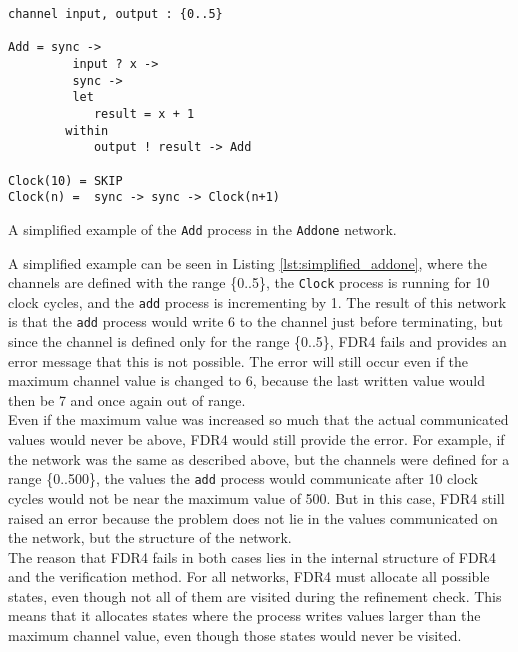 \begin{listing}
\begin{verbatim}
channel input, output : {0..5}

Add = sync ->
         input ? x ->
         sync ->
         let
            result = x + 1
        within
            output ! result -> Add

Clock(10) = SKIP
Clock(n) =  sync -> sync -> Clock(n+1)
\end{verbatim}
\caption{A simplified example of the \texttt{Add} process in the \texttt{Addone} network.}
\label{lst:simplified_addone}
\end{listing}
A simplified example can be seen in Listing \ref{lst:simplified_addone}, where the channels are defined with the range \{0..5\}, the \texttt{Clock} process is running for 10 clock cycles, and the \texttt{add} process is incrementing by 1.
The result of this network is that the \texttt{add} process would write 6 to the channel just before terminating, but since the channel is defined only for the range \{0..5\}, FDR4 fails and provides an error message that this is not possible. The error will still occur even if the maximum channel value is changed to 6, because the last written value would then be 7 and once again out of range. \\

Even if the maximum value was increased so much that the actual communicated values would never be above, FDR4 would still provide the error.
For example, if the network was the same as described above, but the channels were defined for a range \{0..500\}, the values the \texttt{add} process would communicate after 10 clock cycles would not be near the maximum value of 500. But in this case, FDR4 still raised an error because the problem does not lie in the values communicated on the network, but the structure of the network. \\

The reason that FDR4 fails in both cases lies in the internal structure of FDR4 and the verification method. For all networks, FDR4 must allocate all possible states, even though not all of them are visited during the refinement check. This means that it allocates states where the process writes values larger than the maximum channel value, even though those states would never be visited.\\

